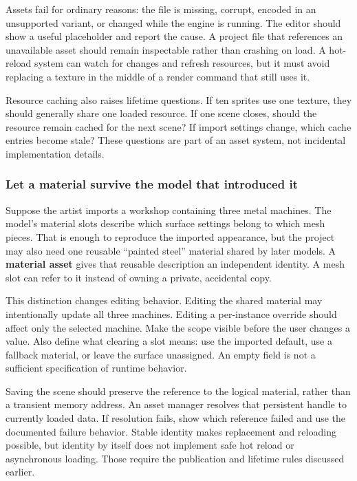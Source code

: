 Assets fail for ordinary reasons: the file is missing, corrupt, encoded in an unsupported variant, or changed while the engine is running. The editor should show a useful placeholder and report the cause. A project file that references an unavailable asset should remain inspectable rather than crashing on load. A hot-reload system can watch for changes and refresh resources, but it must avoid replacing a texture in the middle of a render command that still uses it.

Resource caching also raises lifetime questions. If ten sprites use one texture, they should generally share one loaded resource. If one scene closes, should the resource remain cached for the next scene? If import settings change, which cache entries become stale? These questions are part of an asset system, not incidental implementation details.

\subsubsection{Let a material survive the model that introduced it}\label{06-engine-ii-ch027-let-a-material-survive-the-model-that-introduced-it}

\hypertarget{06-engine-ii-ch027-let-a-material-survive-the-model-that-introduced-it}{}

Suppose the artist imports a workshop containing three metal machines. The model's material slots describe which surface settings belong to which mesh pieces. That is enough to reproduce the imported appearance, but the project may also need one reusable ``painted steel'' material shared by later models. A \textbf{material asset} gives that reusable description an independent identity. A mesh slot can refer to it instead of owning a private, accidental copy.

This distinction changes editing behavior. Editing the shared material may intentionally update all three machines. Editing a per-instance override should affect only the selected machine. Make the scope visible before the user changes a value. Also define what clearing a slot means: use the imported default, use a fallback material, or leave the surface unassigned. An empty field is not a sufficient specification of runtime behavior.

Saving the scene should preserve the reference to the logical material, rather than a transient memory address. An asset manager resolves that persistent handle to currently loaded data. If resolution fails, show which reference failed and use the documented failure behavior. Stable identity makes replacement and reloading possible, but identity by itself does not implement safe hot reload or asynchronous loading. Those require the publication and lifetime rules discussed earlier.

